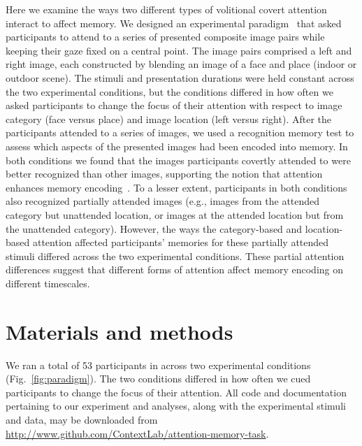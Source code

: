 \documentclass[english]{article}
\begin{document}
Here we examine the ways two different types of volitional covert attention
interact to affect memory. We designed an experimental
paradigm~\citep[following][]{Posn80} that asked participants to attend to a
series of presented composite image pairs while keeping their gaze fixed on a
central point. The image pairs comprised a left and right image, each
constructed by blending an image of a face and place (indoor or outdoor scene).
The stimuli and presentation durations were held constant across the two
experimental conditions, but the conditions differed in how often we asked
participants to change the focus of their attention with respect to image
category (face versus place) and image location (left versus right). After the
participants attended to a series of images, we used a recognition memory test
to assess which aspects of the presented images had been encoded into memory.
In both conditions we found that the images participants covertly attended to
were better recognized than other images, supporting the notion that attention
enhances memory encoding~\citep[i.e., they rated attended images as more
familiar than unattended images;][]{Yone02}. To a lesser extent, participants
in both conditions also recognized partially attended images (e.g., images from
the attended category but unattended location, or images at the attended
location but from the unattended category). However, the ways the
category-based and location-based attention affected participants' memories for
these partially attended stimuli differed across the two experimental conditions.
These partial attention differences suggest that different forms of attention
affect memory encoding on different timescales.

\section*{Materials and methods}

We ran a total of 53 participants in across two experimental conditions
(Fig.~\ref{fig:paradigm}). The two conditions differed in how often we
cued participants to change the focus of their attention. All code and
documentation pertaining to our experiment and analyses, along with the
experimental stimuli and data, may be downloaded from
\url{http://www.github.com/ContextLab/attention-memory-task}.
\end{document}
